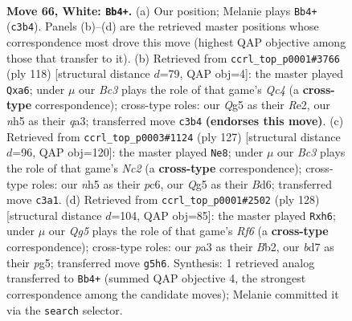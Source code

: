 \documentclass[11pt]{article}
\begin{document}
\clearpage

\begin{figure}[p]\centering
\begin{subfigure}{0.46\textwidth}\centering
\resizebox{\linewidth}{!}{%
\newchessgame
\chessboard[
  setfen={3q1k2/3b1p2/5n2/6Qn/2p4P/p1B2pP1/P6K/1R6 w - - 0 66},
  showmover=false,
  pgfstyle=straightmove, color=movearrow, markmove={c3-b4}
]}
\caption{}
\end{subfigure}\hfill
\begin{subfigure}{0.46\textwidth}\centering
\resizebox{\linewidth}{!}{%
\newchessgame
\chessboard[
  setfen={4n3/5p2/p2p1n2/P2P1k2/2Q5/q6P/4R2K/8 w - - 14 60},
  showmover=false,
  pgfstyle=straightmove, color=movearrow, markmove={c4-a6}
]}
\caption{}
\end{subfigure}
\\[4pt]
\begin{subfigure}{0.46\textwidth}\centering
\resizebox{\linewidth}{!}{%
\newchessgame
\chessboard[
  setfen={8/2n3k1/2Pb2p1/1p2p1Pp/1NqpP2P/P2N4/6K1/5Q2 b - - 10 64},
  showmover=false,
  pgfstyle=straightmove, color=movearrow, markmove={c7-e8}
]}
\caption{}
\end{subfigure}\hfill
\begin{subfigure}{0.46\textwidth}\centering
\resizebox{\linewidth}{!}{%
\newchessgame
\chessboard[
  setfen={2b5/8/2k1nR1p/6p1/1Pp2n2/2P2P2/1B4PK/8 w - - 6 65},
  showmover=false,
  pgfstyle=straightmove, color=movearrow, markmove={f6-h6}
]}
\caption{}
\end{subfigure}
\caption{\textbf{Move 66, White: \texttt{Bb4+}.} (a) Our position; Melanie plays \texttt{Bb4+} (\texttt{c3b4}). Panels (b)--(d) are the retrieved master positions whose correspondence most drove this move (highest QAP objective among those that transfer to it). (b) Retrieved from \texttt{ccrl\_top\_p0001\#3766} (ply 118) [structural distance $d$=79, QAP obj=4]: the master played \texttt{Qxa6}; under $\mu$ our \emph{Bc3} plays the role of that game's \emph{Qc4} (a \textbf{cross-type} correspondence); cross-type roles: our \emph{Q}g5 as their \emph{R}e2, our \emph{n}h5 as their \emph{q}a3; transferred move \texttt{c3b4} \textbf{(endorses this move)}. (c) Retrieved from \texttt{ccrl\_top\_p0003\#1124} (ply 127) [structural distance $d$=96, QAP obj=120]: the master played \texttt{Ne8}; under $\mu$ our \emph{Bc3} plays the role of that game's \emph{Nc2} (a \textbf{cross-type} correspondence); cross-type roles: our \emph{n}h5 as their \emph{p}c6, our \emph{Q}g5 as their \emph{B}d6; transferred move \texttt{c3a1}. (d) Retrieved from \texttt{ccrl\_top\_p0001\#2502} (ply 128) [structural distance $d$=104, QAP obj=85]: the master played \texttt{Rxh6}; under $\mu$ our \emph{Qg5} plays the role of that game's \emph{Rf6} (a \textbf{cross-type} correspondence); cross-type roles: our \emph{p}a3 as their \emph{B}b2, our \emph{b}d7 as their \emph{p}g5; transferred move \texttt{g5h6}. Synthesis: 1 retrieved analog transferred to \texttt{Bb4+} (summed QAP objective 4, the strongest correspondence among the candidate moves); Melanie committed it via the \texttt{search} selector.}
\label{fig:thought-m130}
\end{figure}
\end{document}
